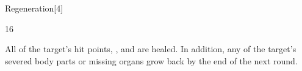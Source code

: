 \begin{spellsection}{Regeneration}[4]

\begin{spellcontent}

\begin{spelltargetinginfo}


 16
\end{spelltargetinginfo}


\begin{spelleffects}



\spelleffect
All of the target's hit points, , and  are healed.
In addition, any of the target's severed body parts or missing organs grow back by the end of the next round.








\end{spelleffects}

\end{spellcontent}
\begin{spellfooter}


\end{spellfooter}
\begin{spellsubcontent}


\end{spellsubcontent}
\end{spellsection}


